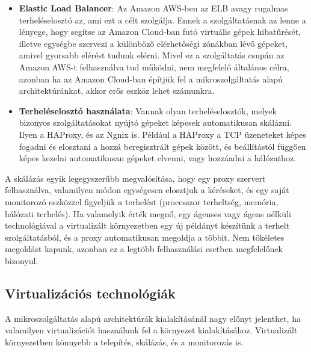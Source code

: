 \documentclass[11pt,magyar,a4paper,twoside,]{report}
\begin{document}
\begin{itemize}
\item
  \textbf{Elastic Load Balancer}\citep{elastic-load-balance}: Az Amazon
  AWS-ben az ELB avagy rugalmas terheléselosztó az, ami ezt a célt
  szolgálja. Ennek a szolgáltatásnak az lenne a lényege, hogy segítse az
  Amazon Cloud-ban futó virtuális gépek hibatűrését, illetve egységbe
  szervezi a különböző elérhetőségi zónákban lévő gépeket, amivel
  gyorsabb elérést tudunk elérni. Mivel ez a szolgáltatás csupán az
  Amazon AWS-t felhasználva tud működni, nem megfelelő általános célra,
  azonban ha az Amazon Cloud-ban építjük fel a mikroszolgáltatás alapú
  architektúránkat, akkor erős eszköz lehet számunkra.
\item
  \textbf{Terheléselosztó használata}: Vannak olyan terheléselosztók,
  melyek bizonyos szolgáltatásokat nyújtó gépeket képesek automatikusan
  skálázni. Ilyen a HAProxy, és az Ngnix is. Például a HAProxy a TCP
  üzeneteket képes fogadni és elosztani a hozzá beregisztrált gépek
  között, és beállítástól függően képes kezelni automatikusan gépeket
  elvenni, vagy hozzáadni a hálózathoz.
\end{itemize}

A skálázás egyik legegyszerűbb megvalósítása, hogy egy proxy szervert
felhasználva, valamilyen módon egységesen elosztjuk a kéréseket, és egy
saját monitorozó eszközzel figyeljük a terhelést (processzor terheltség,
memória, hálózati terhelés). Ha valamelyik érték megnő, egy ágenses vagy
ágens nélküli technológiával a virtualizált környezetben egy új példányt
készítünk a terhelt szolgáltatásból, és a proxy automatikusan megoldja a
többit. Nem tökéletes megoldást kapunk, azonban ez a legtöbb
felhasználási esetben megfelelőnek bizonyul.

\subsection{Virtualizációs
technológiák}\label{virtualizuxe1ciuxf3s-technoluxf3giuxe1k}

A mikroszolgáltatás alapú architektúrák kialakításánál nagy előnyt
jelenthet, ha valamilyen virtualizációt használunk fel a környezet
kialakításához. Virtualizált környezetben könnyebb a telepítés,
skálázás, és a monitorozás is.
\end{document}
